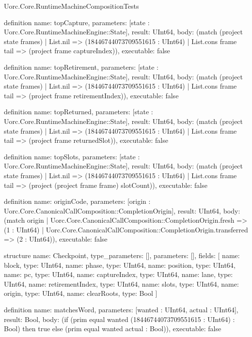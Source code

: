 \begin{lexlean}{Uorc.Core.RuntimeMachineCompositionTests}
\begin{semanticmodule}
definition{
  name: topCapture,
  parameters: [state : Uorc.Core.RuntimeMachineEngine::State],
  result: UInt64,
  body: (match (project state frames)
    | List.nil => (18446744073709551615 : UInt64)
    | List.cons frame tail => (project frame captureIndex)),
  executable: false
}

definition{
  name: topRetirement,
  parameters: [state : Uorc.Core.RuntimeMachineEngine::State],
  result: UInt64,
  body: (match (project state frames)
    | List.nil => (18446744073709551615 : UInt64)
    | List.cons frame tail => (project frame retirementIndex)),
  executable: false
}

definition{
  name: topReturned,
  parameters: [state : Uorc.Core.RuntimeMachineEngine::State],
  result: UInt64,
  body: (match (project state frames)
    | List.nil => (18446744073709551615 : UInt64)
    | List.cons frame tail => (project frame returnedSlot)),
  executable: false
}

definition{
  name: topSlots,
  parameters: [state : Uorc.Core.RuntimeMachineEngine::State],
  result: UInt64,
  body: (match (project state frames)
    | List.nil => (18446744073709551615 : UInt64)
    | List.cons frame tail => (project (project frame frame) slotCount)),
  executable: false
}

definition{
  name: originCode,
  parameters: [origin : Uorc.Core.CanonicalCallComposition::CompletionOrigin],
  result: UInt64,
  body: (match origin
    | Uorc.Core.CanonicalCallComposition::CompletionOrigin.fresh => (1 : UInt64)
    | Uorc.Core.CanonicalCallComposition::CompletionOrigin.transferred => (2 : UInt64)),
  executable: false
}

structure{
  name: Checkpoint,
  type_parameters: [],
  parameters: [],
  fields: [
    {name: block, type: UInt64},
    {name: phase, type: UInt64},
    {name: position, type: UInt64},
    {name: pc, type: UInt64},
    {name: captureIndex, type: UInt64},
    {name: lane, type: UInt64},
    {name: retirementIndex, type: UInt64},
    {name: slots, type: UInt64},
    {name: origin, type: UInt64},
    {name: clearRoots, type: Bool}
  ]
}

definition{
  name: matchesWord,
  parameters: [wanted : UInt64, actual : UInt64],
  result: Bool,
  body: (if (prim equal wanted (18446744073709551615 : UInt64) : Bool) then true else (prim equal wanted actual : Bool)),
  executable: false
}


\end{semanticmodule}
\end{lexlean}
